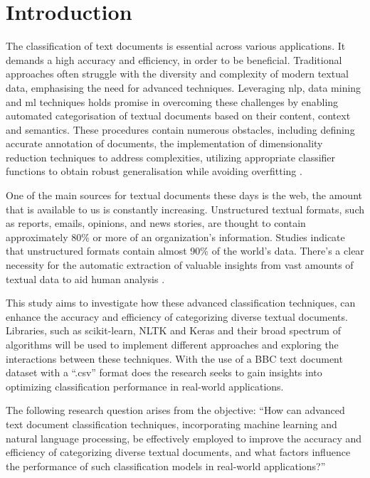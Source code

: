 \chapter{Introduction}

The classification of text documents is essential across various applications. It demands a high accuracy and efficiency, in order to be beneficial. Traditional approaches often struggle with the diversity and complexity of modern textual data, emphasising the need for advanced techniques. Leveraging \ac{nlp}, data mining and \ac{ml} techniques holds promise in overcoming these challenges by enabling automated categorisation of textual documents based on their content, context and semantics. These procedures contain numerous obstacles, including defining accurate annotation of documents, the implementation of dimensionality reduction techniques to address complexities, utilizing appropriate classifier functions to obtain robust generalisation while avoiding overfitting \citep{aurangzeb_review_2010}.

One of the main sources for textual documents these days is the web, the amount that is available to us is constantly increasing. Unstructured textual formats, such as reports, emails, opinions, and news stories, are thought to contain approximately 80\% or more of an organization's information. Studies indicate that unstructured formats contain almost 90\% of the world's data. There's a clear necessity for the automatic extraction of valuable insights from vast amounts of textual data to aid human analysis \citep{aurangzeb_review_2010}.

This study aims to investigate how these advanced classification techniques, can enhance the accuracy and efficiency of categorizing diverse textual documents. Libraries, such as scikit-learn, NLTK and Keras and their broad spectrum of algorithms will be used to implement different approaches and exploring the interactions between these techniques. With the use of a BBC text document dataset with a “.csv” format does the research seeks to gain insights into optimizing classification performance in real-world applications.

The following research question arises from the objective: “How can advanced text document classification techniques, incorporating machine learning and natural language processing, be effectively employed to improve the accuracy and efficiency of categorizing diverse textual documents, and what factors influence the performance of such classification models in real-world applications?”


